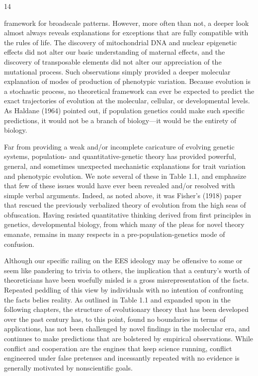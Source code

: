 \documentclass{article}
\begin{document}
14

framework for broadscale patterns. However, more often than not, a deeper look almost always reveals explanations for exceptions that are fully compatible with the rules of life. The discovery of mitochondrial DNA and nuclear epigenetic effects did not alter our basic understanding of maternal effects, and the discovery of transposable elements did not alter our appreciation of the mutational process. Such observations simply provided a deeper molecular explanation of modes of production of phenotypic variation. Because evolution is a stochastic process, no theoretical framework can ever be expected to predict the exact trajectories of evolution at the molecular, cellular, or developmental levels. As Haldane (1964) pointed out, if population genetics could make such specific predictions, it would not be a branch of biology—it would be the entirety of biology.

Far from providing a weak and/or incomplete caricature of evolving genetic systems, population- and quantitative-genetic theory has provided powerful, general, and sometimes unexpected mechanistic explanations for trait variation and phenotypic evolution. We note several of these in Table 1.1, and emphasize that few of these issues would have ever been revealed and/or resolved with simple verbal arguments. Indeed, as noted above, it was Fisher's (1918) paper that rescued the previously verbalized theory of evolution from the high seas of obfuscation. Having resisted quantitative thinking derived from first principles in genetics, developmental biology, from which many of the pleas for novel theory emanate, remains in many respects in a pre-population-genetics mode of confusion.

Although our specific railing on the EES ideology may be offensive to some or seem like pandering to trivia to others, the implication that a century's worth of theoreticians have been woefully misled is a gross misrepresentation of the facts. Repeated peddling of this view by individuals with no intention of confronting the facts belies reality. As outlined in Table 1.1 and expanded upon in the following chapters, the structure of evolutionary theory that has been developed over the past century has, to this point, found no boundaries in terms of applications, has not been challenged by novel findings in the molecular era, and continues to make predictions that are bolstered by empirical observations. While conflict and cooperation are the engines that keep science running, conflict engineered under false pretenses and incessantly repeated with no evidence is generally motivated by nonscientific goals.
\end{document}
